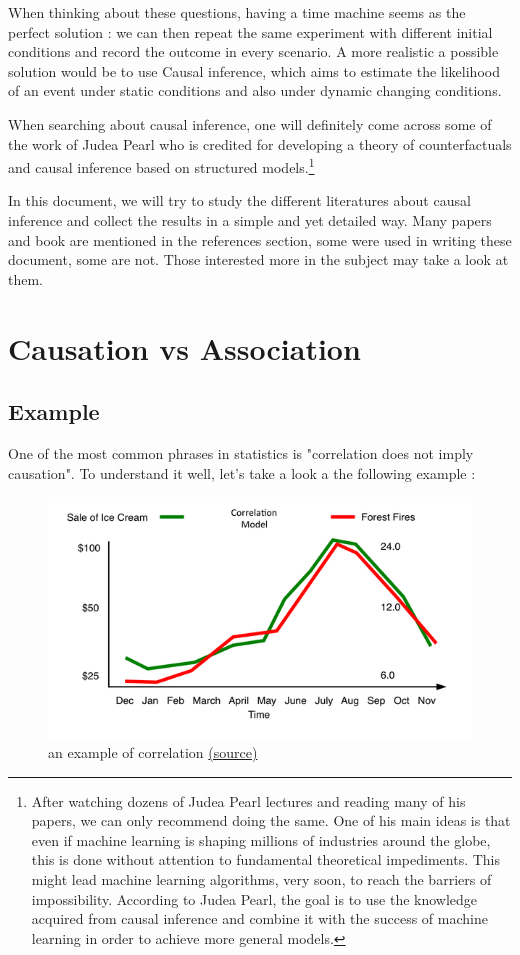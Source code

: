 \documentclass{article}
\begin{document}
When thinking about these questions, having a time machine seems as the perfect solution : we can then repeat the same experiment with different initial conditions and record the outcome in every scenario. A more realistic a possible solution would be to use Causal inference, which aims to estimate the likelihood of an event under static conditions and also under dynamic changing conditions.

When searching about causal inference, one will definitely come across some of the work of Judea Pearl who is credited for developing a theory of counterfactuals and causal inference based on structured models.\footnote{After watching dozens of Judea Pearl lectures and reading many of his papers, we can only recommend doing the same. One of his main ideas is that even if machine learning is shaping millions of industries around the globe, this is done without attention to fundamental theoretical impediments. This might lead machine learning algorithms, very soon, to reach the barriers of impossibility. According to Judea Pearl, the goal is to use the knowledge acquired from causal inference and combine it with the success of machine learning in order to achieve more general models.}

In this document, we will try to study the different literatures about causal inference and collect the results in a simple and yet detailed way. Many papers and book are mentioned in the references section, some were used in writing these document, some are not. Those interested more in the subject may take a look at them.  


\newpage


\section{Causation vs Association}

	\subsection{Example}
	
One of the most common phrases in statistics is "correlation does not imply causation". To understand it well, let's take a look a the following example :

\begin{figure}[h]
\centering
\includegraphics[width=0.6 \textwidth]{figures/corr_caus.png}
\caption{an example of correlation \href{https://www.decisionskills.com/blog/how-ice-cream-kills-understanding-cause-and-effect}{(source)}}
\end{figure}
\end{document}
